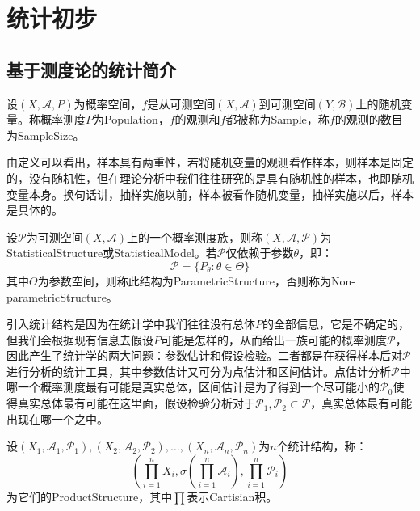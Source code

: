 \chapter{统计初步}

\section{基于测度论的统计简介}
\begin{definition}
	设$(X,\mathscr{A},P)$为概率空间，$f$是从可测空间$(X,\mathscr{A})$到可测空间$(Y,\mathscr{B})$上的随机变量。称概率测度$P$为\gls{Population}，$f$的观测和$f$都被称为\gls{Sample}，称$f$的观测的数目为\gls{SampleSize}。
\end{definition}
\begin{note}
	由定义可以看出，样本具有两重性，若将随机变量的观测看作样本，则样本是固定的，没有随机性，但在理论分析中我们往往研究的是具有随机性的样本，也即随机变量本身。换句话讲，抽样实施以前，样本被看作随机变量，抽样实施以后，样本是具体的。
\end{note}
\begin{definition}
	设$\mathscr{P}$为可测空间$(X,\mathscr{A})$上的一个概率测度族，则称$(X,\mathscr{A},\mathscr{P})$为\gls{StatisticalStructure}或\gls{StatisticalModel}。若$\mathscr{P}$仅依赖于参数$\theta$，即：
	\begin{equation*}
		\mathscr{P}=\{P_{\theta}:\theta\in\Theta\}
	\end{equation*}
	其中$\Theta$为参数空间，则称此结构为\gls{ParametricStructure}，否则称为\gls{Non-parametricStructure}。
\end{definition}
\begin{note}
	引入统计结构是因为在统计学中我们往往没有总体$P$的全部信息，它是不确定的，但我们会根据现有信息去假设$P$可能是怎样的，从而给出一族可能的概率测度$\mathscr{P}$，因此产生了统计学的两大问题：参数估计和假设检验。二者都是在获得样本后对$\mathscr{P}$进行分析的统计工具，其中参数估计又可分为点估计和区间估计。点估计分析$\mathscr{P}$中哪一个概率测度最有可能是真实总体，区间估计是为了得到一个尽可能小的$\mathscr{P}_0$使得真实总体最有可能在这里面，假设检验分析对于$\mathscr{P}_1,\mathscr{P_2}\subset\mathscr{P}$，真实总体最有可能出现在哪一个之中。
\end{note}
\begin{definition}
	设$(X_1,\mathscr{A}_1,\mathscr{P}_1),(X_2,\mathscr{A}_2,\mathscr{P}_2),\dots,(X_n,\mathscr{A}_n,\mathscr{P}_n)$为$n$个统计结构，称：
	\begin{equation*}
		\left(\prod_{i=1}^nX_i,\sigma\left(\prod_{i=1}^n\mathscr{A}_i\right),\prod_{i=1}^n\mathscr{P}_i\right)
	\end{equation*}
	为它们的\gls{ProductStructure}，其中$\prod$表示Cartisian积。
\end{definition}
